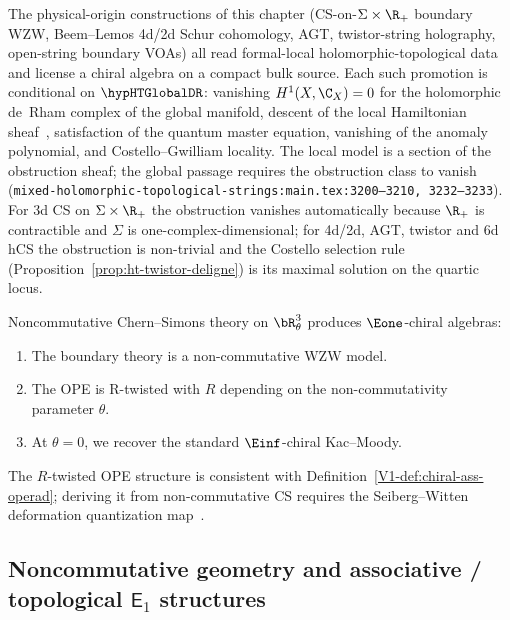 \begin{remark}
\label{rem:ht-global-de-rham-physical-origins}
The physical-origin constructions of this chapter (CS-on-$\Sigma\times\R_+$
boundary WZW, Beem--Lemos 4d/2d Schur cohomology, AGT, twistor-string
holography, open-string boundary VOAs) all read formal-local
holomorphic-topological data and license a chiral algebra on a
compact bulk source. Each such promotion is conditional on
$\hypHTGlobalDR$: vanishing $H^1(X,\C_X) = 0$ for the holomorphic
de~Rham complex of the global manifold, descent of the local
Hamiltonian sheaf~\cite[\S4--5]{CG17}, satisfaction of the quantum
master equation, vanishing of the anomaly polynomial, and
Costello--Gwilliam locality. The local model is a section of the
obstruction sheaf; the global passage requires the obstruction
class to vanish
(\texttt{mixed-holomorphic-topological-strings:main.tex:3200--3210,
3232--3233}). For 3d CS on $\Sigma\times\R_+$ the obstruction
vanishes automatically because $\R_+$ is contractible and $\Sigma$
is one-complex-dimensional; for 4d/2d, AGT, twistor and 6d hCS the
obstruction is non-trivial and the Costello selection rule
(Proposition~\ref{prop:ht-twistor-deligne}) is its maximal solution
on the quartic locus.
\end{remark}

\begin{remark}
Noncommutative Chern--Simons theory on $\bR^3_\theta$ produces
$\Eone$-chiral algebras:
\begin{enumerate}[label=(\roman*)]
\item The boundary theory is a non-commutative WZW model.
\item The OPE is R-twisted with $R$ depending on the non-commutativity parameter $\theta$.
\item At $\theta = 0$, we recover the standard $\Einf$-chiral Kac--Moody.
\end{enumerate}
\end{remark}

\begin{remark}
The $R$-twisted OPE structure is consistent with Definition~\ref*{V1-def:chiral-ass-operad}; deriving it from non-commutative CS requires the Seiberg--Witten deformation quantization map~\cite{SW99}.
\end{remark}


\subsection{\texorpdfstring{Noncommutative geometry and associative / topological $\mathsf{E}_1$ structures}{Noncommutative geometry and associative / topological E1 structures}}

